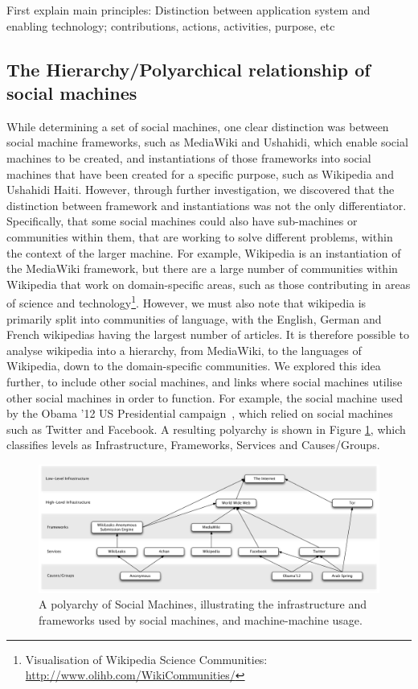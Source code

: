 \documentclass{sig-alternate}
\begin{document}
First explain main principles: Distinction between application system and enabling technology; contributions, actions, activities, purpose, etc

\subsection{The Hierarchy/Polyarchical relationship of social machines}

While determining a set of social machines, one clear distinction was between social machine frameworks, such as MediaWiki and Ushahidi, which enable
social machines to be created, and instantiations of those frameworks into social machines that have been created for a specific purpose, such as Wikipedia
and Ushahidi Haiti. However, through further investigation, we discovered that the distinction between framework and instantiations was not the only
differentiator. Specifically, that some social machines could also have sub-machines or communities within them, that are working to solve different problems,
within the context of the larger machine. For example, Wikipedia is an instantiation of the MediaWiki framework, but there are a large number of
communities within Wikipedia that work on domain-specific areas, such as those contributing in areas of science and technology\footnote{Visualisation of Wikipedia Science Communities: \url{http://www.olihb.com/WikiCommunities/}}. However, we must also note that wikipedia is primarily split into communities of language, with the English, German and French wikipedias having the largest number of articles. It is therefore possible to analyse wikipedia into a hierarchy, from MediaWiki, to the languages of Wikipedia, down to the domain-specific communities. We explored this idea further, to include other social machines, and links where social machines utilise other social machines in order to function. For example, the social machine used by the Obama '12 US Presidential campaign~\cite{obamakieron}, which relied on social machines such as Twitter and Facebook. A resulting polyarchy is shown in Figure \ref{polyarchy}, which classifies levels as Infrastructure, Frameworks, Services and Causes/Groups.

\begin{figure}[htb]
\begin{center}
\includegraphics[width=18cm]{img/polyarchy.pdf}
\caption{A polyarchy of Social Machines, illustrating the infrastructure and frameworks used by social machines, and machine-machine usage.} \label{polyarchy}
\end{center}
\end{figure}
\end{document}
